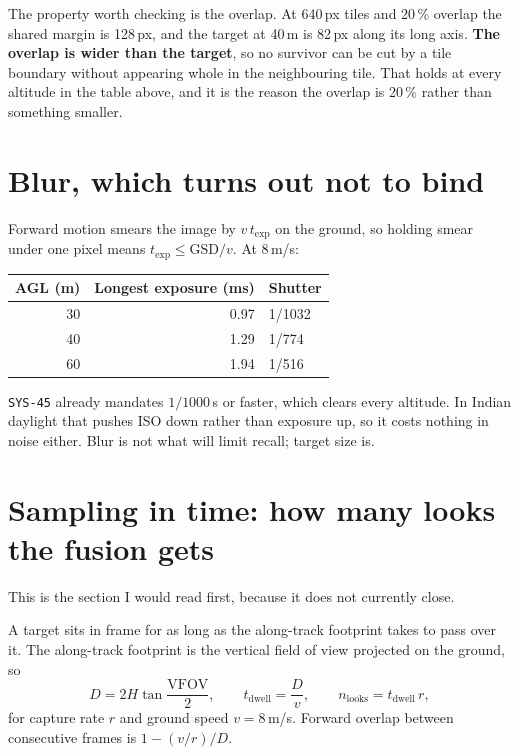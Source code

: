 \documentclass[11pt,a4paper]{article}
\begin{document}
The property worth checking is the overlap. At 640\,px tiles and
20\,\% overlap the shared margin is
128\,px, and the target at 40\,m is
82\,px along its long axis. \textbf{The overlap is wider than
the target}, so no survivor can be cut by a tile boundary without appearing
whole in the neighbouring tile. That holds at every altitude in the table
above, and it is the reason the overlap is 20\,\% rather than something
smaller.

\section{Blur, which turns out not to bind}

Forward motion smears the image by $v\,t_{\text{exp}}$ on the ground, so
holding smear under one pixel means $t_{\text{exp}} \le \text{GSD}/v$. At
8\,m/s:

\begin{center}
\begin{tabular}{r r l}
\toprule
\textbf{AGL} (m) & \textbf{Longest exposure} (ms) & \textbf{Shutter} \\
\midrule
30 & 0.97 & 1/1032 \\
40 & 1.29 & 1/774 \\
60 & 1.94 & 1/516 \\
\bottomrule
\end{tabular}
\end{center}

\texttt{SYS-45} already mandates $1/1000$\,s or faster, which clears every
altitude. In Indian daylight that pushes ISO down rather than exposure up, so
it costs nothing in noise either. Blur is not what will limit recall; target
size is.

\section{Sampling in time: how many looks the fusion gets}

This is the section I would read first, because it does not currently close.

A target sits in frame for as long as the along-track footprint takes to pass
over it. The along-track footprint is the vertical field of view projected on
the ground, so
\[
D = 2H\tan\frac{\text{VFOV}}{2},
\qquad
t_{\text{dwell}} = \frac{D}{v},
\qquad
n_{\text{looks}} = t_{\text{dwell}}\, r ,
\]
for capture rate $r$ and ground speed $v = 8$\,m/s. Forward
overlap between consecutive frames is $1 - (v/r)/D$.
\end{document}
